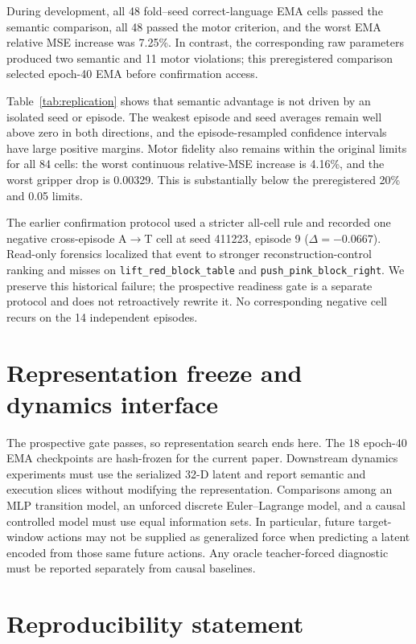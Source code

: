 \documentclass{article}
\begin{document}
During development, all 48 fold--seed correct-language EMA cells passed the
semantic comparison, all 48 passed the motor criterion, and the worst EMA
relative MSE increase was 7.25\%.  In contrast, the corresponding raw
parameters produced two semantic and 11 motor violations; this preregistered
comparison selected epoch-40 EMA before confirmation access.

Table~\ref{tab:replication} shows that semantic advantage is not driven by an
isolated seed or episode.  The weakest episode and seed averages remain well
above zero in both directions, and the episode-resampled confidence intervals
have large positive margins.  Motor fidelity also remains within the original
limits for all 84 cells: the worst continuous relative-MSE increase is 4.16\%,
and the worst gripper drop is 0.00329.  This is substantially below the
preregistered 20\% and 0.05 limits.

The earlier confirmation protocol used a stricter all-cell rule and recorded
one negative cross-episode A$\rightarrow$T cell at seed 411223, episode 9
($\Delta=-0.0667$).  Read-only forensics localized that event to stronger
reconstruction-control ranking and misses on
\texttt{lift\_red\_block\_table} and
\texttt{push\_pink\_block\_right}.  We preserve this historical failure; the
prospective readiness gate is a separate protocol and does not retroactively
rewrite it.  No corresponding negative cell recurs on the 14 independent
episodes.

\section{Representation freeze and dynamics interface}

The prospective gate passes, so representation search ends here.  The 18
epoch-40 EMA checkpoints are hash-frozen for the current paper.  Downstream
dynamics experiments must use the serialized 32-D latent and report semantic
and execution slices without modifying the representation.  Comparisons among
an MLP transition model, an unforced discrete Euler--Lagrange model, and a
causal controlled model must use equal information sets.  In particular,
future target-window actions may not be supplied as generalized force when
predicting a latent encoded from those same future actions.  Any oracle
teacher-forced diagnostic must be reported separately from causal baselines.

\section{Reproducibility statement}
\end{document}
